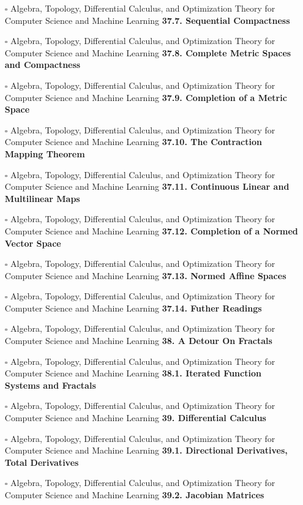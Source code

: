 \documentclass[a4, landscape, 12pt]{article}
\newcommand{\checkbox}{$\square$}%
\begin{document}
\begin{itemize}
{}
\item [\checkbox]  Algebra, Topology, Differential Calculus, and Optimization Theory for Computer Science and Machine Learning \textbf{ 37.7. Sequential Compactness
}
\item [\checkbox]  Algebra, Topology, Differential Calculus, and Optimization Theory for Computer Science and Machine Learning \textbf{ 37.8. Complete Metric Spaces and Compactness
}
\item [\checkbox]  Algebra, Topology, Differential Calculus, and Optimization Theory for Computer Science and Machine Learning \textbf{ 37.9. Completion of a Metric Space
}
\item [\checkbox]  Algebra, Topology, Differential Calculus, and Optimization Theory for Computer Science and Machine Learning \textbf{ 37.10. The Contraction Mapping Theorem
}
\item [\checkbox]  Algebra, Topology, Differential Calculus, and Optimization Theory for Computer Science and Machine Learning \textbf{ 37.11. Continuous Linear and Multilinear Maps
}
\item [\checkbox]  Algebra, Topology, Differential Calculus, and Optimization Theory for Computer Science and Machine Learning \textbf{ 37.12. Completion of a Normed Vector Space
}
\item [\checkbox]  Algebra, Topology, Differential Calculus, and Optimization Theory for Computer Science and Machine Learning \textbf{ 37.13. Normed Affine Spaces
}
\item [\checkbox]  Algebra, Topology, Differential Calculus, and Optimization Theory for Computer Science and Machine Learning \textbf{ 37.14. Futher Readings
}
\item [\checkbox]  Algebra, Topology, Differential Calculus, and Optimization Theory for Computer Science and Machine Learning \textbf{ 38. A Detour On Fractals
}
\item [\checkbox]  Algebra, Topology, Differential Calculus, and Optimization Theory for Computer Science and Machine Learning \textbf{ 38.1. Iterated Function Systems and Fractals
}
\item [\checkbox]  Algebra, Topology, Differential Calculus, and Optimization Theory for Computer Science and Machine Learning \textbf{ 39. Differential Calculus
}
\item [\checkbox]  Algebra, Topology, Differential Calculus, and Optimization Theory for Computer Science and Machine Learning \textbf{ 39.1. Directional Derivatives, Total Derivatives
}
\item [\checkbox]  Algebra, Topology, Differential Calculus, and Optimization Theory for Computer Science and Machine Learning \textbf{ 39.2. Jacobian Matrices
}
\end{itemize}
\end{document}
